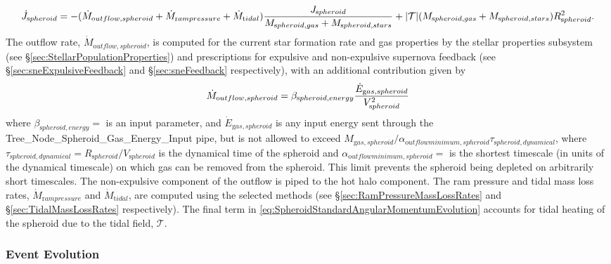\begin{equation}
 \dot{J}_{\mathrm spheroid} = - (\dot{M}_{\mathrm outflow, spheroid} + \dot{M}_{\mathrm ram pressure}+\dot{M}_{\mathrm tidal}) {J_{\mathrm spheroid} \over M_{\mathrm spheroid, gas} + M_{\mathrm spheroid, stars}} + |\mathcal{T}| ( M_{\mathrm spheroid, gas} + M_{\mathrm spheroid, stars} ) R_{\mathrm spheroid}^2.
 \label{eq:SpheroidStandardAngularMomentumEvolution}
\end{equation}
The outflow rate, $\dot{M}_{\mathrm outflow, spheroid}$, is computed for the current star formation rate and gas properties by the stellar properties subsystem (see \S\ref{sec:StellarPopulationProperties}) and prescriptions for expulsive and non-expulsive supernova feedback (see \S\ref{sec:sneExpulsiveFeedback} and \S\ref{sec:sneFeedback} respectively), with an additional contribution given by
\begin{equation}
 \dot{M}_{\mathrm outflow, spheroid} = \beta_{\mathrm spheroid, energy} {\dot{E}_{\mathrm gas, spheroid} \over V_{\mathrm spheroid}^2}
\end{equation}
where $\beta_{\mathrm spheroid, energy}=${\normalfont \ttfamily [spheroidEnergeticOutflowMassRate]} is an input parameter, and $\dot{E}_{\mathrm gas,spheroid}$ is any input energy sent through the {\normalfont \ttfamily Tree\_Node\_Spheroid\_Gas\_Energy\_Input} pipe, but is not allowed to exceed $M_{\mathrm gas, spheroid}/ \alpha_{\mathrm outflow minimum, spheroid} \tau_{\mathrm spheroid, dynamical}$, where $\tau_{\mathrm spheroid, dynamical}=R_{\mathrm spheroid}/V_{\mathrm spheroid}$ is the dynamical time of the spheroid and $\alpha_{\mathrm outflow minimum, spheroid}=${\normalfont \ttfamily [spheroidOutflowTimescaleMinimum]} is the shortest timescale (in units of the dynamical timescale) on which gas can be removed from the spheroid. This limit prevents the spheroid being depleted on arbitrarily short timescales. The non-expulsive \gls{component} of the outflow is piped to the hot halo component. The ram pressure and tidal mass loss rates, $\dot{M}_{\mathrm ram pressure}$ and $\dot{M}_{\mathrm tidal}$, are computed using the selected methods (see \S\ref{sec:RamPressureMassLossRates} and \S\ref{sec:TidalMassLossRates} respectively). The final term in \ref{eq:SpheroidStandardAngularMomentumEvolution} accounts for tidal heating of the spheroid due to the tidal field, $\mathcal{T}$.

\subsubsection{Event Evolution}

